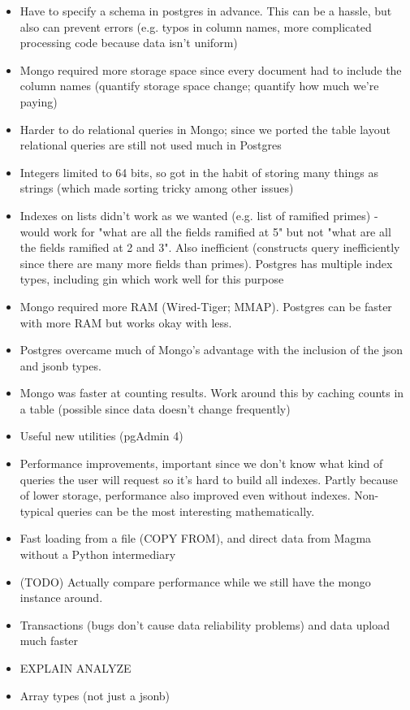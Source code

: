\documentclass{article}
\begin{document}
\begin{itemize}
\item Have to specify a schema in postgres in advance.  This can be a hassle, but also can prevent errors (e.g. typos in column names, more complicated processing code because data isn't uniform)
\item Mongo required more storage space since every document had to include the column names (quantify storage space change; quantify how much we're paying)
\item Harder to do relational queries in Mongo; since we ported the table layout relational queries are still not used much in Postgres
\item Integers limited to 64 bits, so got in the habit of storing many things as strings (which made sorting tricky among other issues)
\item Indexes on lists didn't work as we wanted (e.g. list of ramified primes) - would work for "what are all the fields ramified at 5" but not "what are all the fields ramified at 2 and 3".  Also inefficient (constructs query inefficiently since there are many more fields than primes).  Postgres has multiple index types, including gin which work well for this purpose
\item Mongo required more RAM (Wired-Tiger; MMAP). Postgres can be faster with more RAM but works okay with less.
\item Postgres overcame much of Mongo's advantage with the inclusion of the json and jsonb types.
\item Mongo was faster at counting results.  Work around this by caching counts in a table (possible since data doesn't change frequently)
\item Useful new utilities (pgAdmin 4)
\item Performance improvements, important since we don't know what kind of queries the user will request so it's hard to build all indexes.  Partly because of lower storage, performance also improved even without indexes.  Non-typical queries can be the most interesting mathematically.
\item Fast loading from a file (COPY FROM), and direct data from Magma without a Python intermediary
\item (TODO) Actually compare performance while we still have the mongo instance around.
\item Transactions (bugs don't cause data reliability problems) and data upload much faster
\item EXPLAIN ANALYZE
\item Array types (not just a jsonb)
\end{itemize}
\end{document}
